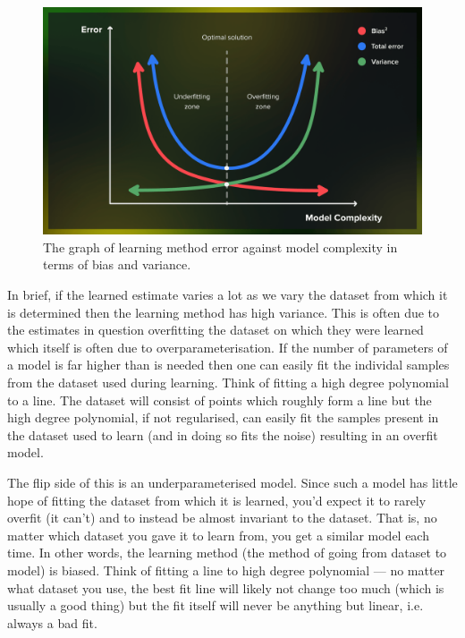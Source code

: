 \documentclass[11pt]{article}
\begin{document}
\begin{figure}[t]
    \centering
    \includegraphics[width=\columnwidth]{./figures/supervised_learning/bias_variance.png}
    \caption{The graph of learning method error against model complexity in terms of bias and variance. }
    \label{fig:bias_variance}
\end{figure}

In brief, if the learned estimate varies a lot as we vary the dataset from which it is determined then the learning method has high variance. This is often due to the estimates in question overfitting the dataset on which they were learned which itself is often due to overparameterisation. If the number of parameters of a model is far higher than is needed then one can easily fit the individal samples from the dataset used during learning. Think of fitting a high degree polynomial to a line. The dataset will consist of points which roughly form a line but the high degree polynomial, if not regularised, can easily fit the samples present in the dataset used to learn (and in doing so fits the noise) resulting in an overfit model.

The flip side of this is an underparameterised model. Since such a model has little hope of fitting the dataset from which it is learned, you'd expect it to rarely overfit (it can't) and to instead be almost invariant to the dataset. That is, no matter which dataset you gave it to learn from, you get a similar model each time. In other words, the learning method (the method of going from dataset to model) is biased. Think of fitting a line to high degree polynomial — no matter what dataset you use, the best fit line will likely not change too much (which is usually a good thing) but the fit itself will never be anything but linear, i.e. always a bad fit. 
\end{document}
